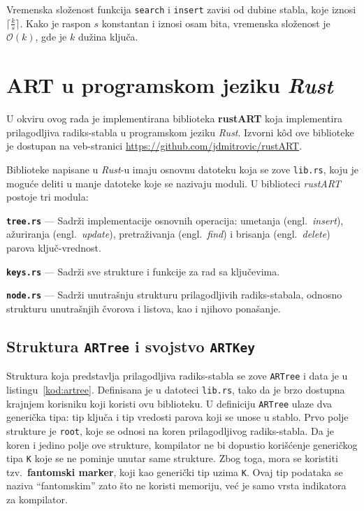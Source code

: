 \documentclass[12pt,oneside]{memoir}
\begin{document}
Vremenska složenost funkcija \texttt{search} i \texttt{insert}
zavisi od dubine stabla, koje iznosi
$ \lceil \frac{k}{s} \rceil $. Kako je raspon $s$ konstantan i
iznosi osam bita, vremenska složenost je
$ \mathcal{O}(k) $, gde je $k$ dužina ključa.

\chapter{ART u programskom jeziku \textit{Rust}}

U okviru ovog rada je implementirana biblioteka \textbf{rustART}
koja implementira prilagodljiva radiks-stabla u programskom
jeziku \textit{Rust}. Izvorni kôd ove biblioteke je dostupan na
veb-stranici \url{https://github.com/jdmitrovic/rustART}.

Biblioteke napisane u \textit{Rust}-u
imaju osnovnu datoteku koja se zove \texttt{lib.rs},
koju je moguće deliti u manje datoteke koje se nazivaju
moduli. U biblioteci \textit{rustART} postoje
tri modula:

\begin{description}
  \item{\textbf{\texttt{tree.rs}}} --- Sadrži implementacije osnovnih operacija:
        umetanja (engl.\ \textit{insert}), ažuriranja (engl.\ \textit{update}),
        pretraživanja (engl.\ \textit{find}) i brisanja (engl.\ \textit{delete})
        parova ključ-vrednost.

  \item{\textbf{\texttt{keys.rs}}} --- Sadrži sve strukture i funkcije za rad sa ključevima.

  \item{\textbf{\texttt{node.rs}}} --- Sadrži unutrašnju strukturu prilagodljivih
        radiks-stabala, odnosno strukturu unutrašnjih čvorova i listova,
        kao i njihovo ponašanje.
\end{description}


\section{Struktura \texttt{ARTree} i svojstvo \texttt{ARTKey}}

Struktura koja predstavlja prilagodljiva radiks-stabla se zove \texttt{ARTree}
i data je u listingu~\ref{kod:artree}. Definisana je u datoteci \texttt{lib.rs},
tako da je brzo dostupna krajnjem korisniku koji koristi ovu biblioteku.
U definiciju \texttt{ARTree} ulaze dva generička tipa: tip ključa i tip vredosti
parova koji se unose u stablo. Prvo polje strukture je \texttt{root}, koje se odnosi
na koren prilagodljivog radiks-stabla. Da je koren i jedino polje ove strukture,
kompilator ne bi dopustio korišćenje generičkog tipa \texttt{K} koje se ne pominje
unutar same strukture. Zbog toga, mora se koristiti tzv.\ \textbf{fantomski marker},
koji kao generički tip uzima \texttt{K}. Ovaj tip podataka se naziva ``fantomskim''
zato što ne koristi memoriju, već je samo vrsta indikatora za kompilator.
\end{document}
